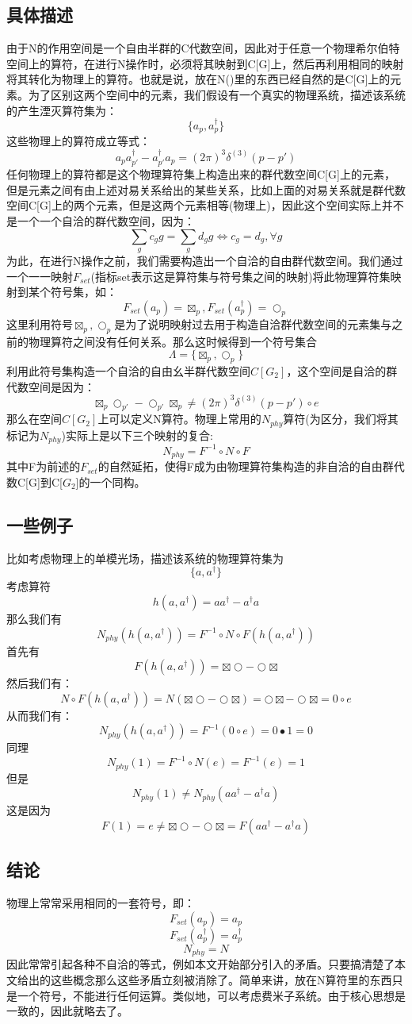 \subsection{具体描述}
由于N的作用空间是一个自由半群的C代数空间，因此对于任意一个物理希尔伯特空间上的算符，在进行N操作时，必须将其映射到C[G]上，然后再利用相同的映射将其转化为物理上的算符。也就是说，放在N()里的东西已经自然的是C[G]上的元素。为了区别这两个空间中的元素，我们假设有一个真实的物理系统，描述该系统的产生湮灭算符集为：
\[\{a_p,a_p^\dagger\}\]
这些物理上的算符成立等式：
\[a_pa_{p'}^\dagger-a_{p'}^\dagger a_p=(2\pi)^3\delta^{(3)}(p-p')\]
任何物理上的算符都是这个物理算符集上构造出来的群代数空间C[G]上的元素，但是元素之间有由上述对易关系给出的某些关系，比如上面的对易关系就是群代数空间C[G]上的两个元素，但是这两个元素相等(物理上)，因此这个空间实际上并不是一个一个自洽的群代数空间，因为：
\[\sum_g c_g g=\sum_g d_g g \Leftrightarrow c_g=d_g,\forall g\]
为此，在进行N操作之前，我们需要构造出一个自洽的自由群代数空间。我们通过一个一一映射$F_{set}$(指标set表示这是算符集与符号集之间的映射)将此物理算符集映射到某个符号集，如：
\[F_{set}(a_p)=\boxtimes_p,F_{set}(a_p^\dagger)=\bigcirc_p\]
这里利用符号$\boxtimes_p,\bigcirc_p$是为了说明映射过去用于构造自洽群代数空间的元素集与之前的物理算符之间没有任何关系。那么这时候得到一个符号集合
\[\Lambda=\{\boxtimes_p,\bigcirc_p\}\]
利用此符号集构造一个自洽的自由幺半群代数空间$C[G_2]$，这个空间是自洽的群代数空间是因为：
\[\boxtimes_p\bigcirc_{p'}-\bigcirc_{p'}\boxtimes_p\neq (2\pi)^3\delta^{(3)}(p-p')\circ e\]
那么在空间$C[G_2]$上可以定义N算符。物理上常用的$N_{phy}$算符(为区分，我们将其标记为$N_{phy}$)实际上是以下三个映射的复合:
\[N_{phy}=F^{-1}\circ N \circ F\]
其中F为前述的$F_{set}$的自然延拓，使得F成为由物理算符集构造的非自洽的自由群代数C[G]到C[$G_2$]的一个同构。
\subsection{一些例子}
比如考虑物理上的单模光场，描述该系统的物理算符集为
\[\{a,a^\dagger\}\]
考虑算符
\[h(a,a^\dagger)=aa^\dagger-a^\dagger a\]
那么我们有
\[N_{phy}(h(a,a^\dagger))=F^{-1}\circ N \circ F (h(a,a^\dagger))\]
首先有
\[F (h(a,a^\dagger))=\boxtimes\bigcirc-\bigcirc\boxtimes\]
然后我们有：
\[N\circ F (h(a,a^\dagger))=N(\boxtimes\bigcirc-\bigcirc\boxtimes)=\bigcirc\boxtimes-\bigcirc\boxtimes=0\circ e\]
从而我们有：
\[N_{phy}(h(a,a^\dagger))=F^{-1} (0\circ e)=0\bullet 1=0\]
同理
\[N_{phy}(1)=F^{-1} \circ N (e)=F^{-1}(e)=1\]
但是
\[N_{phy}(1)\neq N_{phy}(aa^\dagger-a^\dagger a)\]
这是因为
\[F(1)=e\neq \boxtimes\bigcirc-\bigcirc\boxtimes=F(aa^\dagger-a^\dagger a)\]
\subsection{结论}
物理上常常采用相同的一套符号，即：
\[F_{set}(a_p)=a_p\]
\[F_{set}(a_p^\dagger)=a_p^\dagger\]
\[N_{phy}=N\]
因此常常引起各种不自洽的等式，例如本文开始部分引入的矛盾。只要搞清楚了本文给出的这些概念那么这些矛盾立刻被消除了。简单来讲，放在N算符里的东西只是一个符号，不能进行任何运算。类似地，可以考虑费米子系统。由于核心思想是一致的，因此就略去了。\par